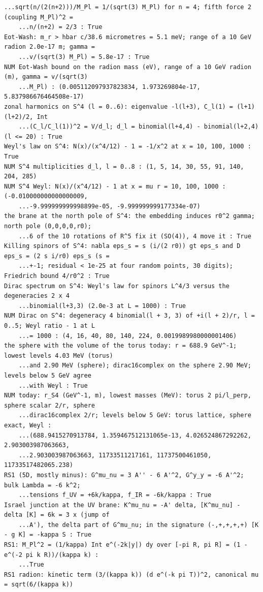 \documentclass[10pt,a4paper]{article}
\begin{document}
\begin{Verbatim}[fontsize=\small,frame=single,framesep=2mm]
    ...sqrt(n/(2(n+2)))/M_Pl = 1/(sqrt(3) M_Pl) for n = 4; fifth force 2 (coupling M_Pl)^2 =
    ...n/(n+2) = 2/3 : True
Eot-Wash: m_r > hbar c/38.6 micrometres = 5.1 meV; range of a 10 GeV radion 2.0e-17 m; gamma =
    ...v/(sqrt(3) M_Pl) = 5.8e-17 : True
NUM Eot-Wash bound on the radion mass (eV), range of a 10 GeV radion (m), gamma = v/(sqrt(3)
    ...M_Pl) : (0.005112097937823834, 1.973269804e-17, 5.837986676464508e-17)
zonal harmonics on S^4 (l = 0..6): eigenvalue -l(l+3), C_l(1) = (l+1)(l+2)/2, Int
    ...(C_l/C_l(1))^2 = V/d_l; d_l = binomial(l+4,4) - binomial(l+2,4) (l <= 20) : True
Weyl's law on S^4: N(x)/(x^4/12) - 1 = -1/x^2 at x = 10, 100, 1000 : True
NUM S^4 multiplicities d_l, l = 0..8 : (1, 5, 14, 30, 55, 91, 140, 204, 285)
NUM S^4 Weyl: N(x)/(x^4/12) - 1 at x = mu r = 10, 100, 1000 : (-0.010000000000000009,
    ...-9.999999999998899e-05, -9.999999999177334e-07)
the brane at the north pole of S^4: the embedding induces r0^2 gamma; north pole (0,0,0,0,r0);
    ...6 of the 10 rotations of R^5 fix it (SO(4)), 4 move it : True
Killing spinors of S^4: nabla eps_s = s (i/(2 r0)) gt eps_s and D eps_s = (2 s i/r0) eps_s (s =
    ...+-1; residual < 1e-25 at four random points, 30 digits); Friedrich bound 4/r0^2 : True
Dirac spectrum on S^4: Weyl's law for spinors L^4/3 versus the degeneracies 2 x 4
    ...binomial(l+3,3) (2.0e-3 at L = 1000) : True
NUM Dirac on S^4: degeneracy 4 binomial(l + 3, 3) of +i(l + 2)/r, l = 0..5; Weyl ratio - 1 at L
    ...= 1000 : (4, 16, 40, 80, 140, 224, 0.0019989980000001406)
the sphere with the volume of the torus today: r = 688.9 GeV^-1; lowest levels 4.03 MeV (torus)
    ...and 2.90 MeV (sphere); dirac16complex on the sphere 2.90 MeV; levels below 5 GeV agree
    ...with Weyl : True
NUM today: r_S4 (GeV^-1, m), lowest masses (MeV): torus 2 pi/l_perp, sphere scalar 2/r, sphere
    ...dirac16complex 2/r; levels below 5 GeV: torus lattice, sphere exact, Weyl :
    ...(688.9415270913784, 1.359467512131065e-13, 4.026524867292262, 2.903003987063663,
    ...2.903003987063663, 11733511217161, 11737500461050, 11733517482065.238)
RS1 (5D, mostly minus): G^mu_nu = 3 A'' - 6 A'^2, G^y_y = -6 A'^2; bulk Lambda = -6 k^2;
    ...tensions f_UV = +6k/kappa, f_IR = -6k/kappa : True
Israel junction at the UV brane: K^mu_nu = -A' delta, [K^mu_nu] - delta [K] = 6k = 3 x (jump of
    ...A'), the delta part of G^mu_nu; in the signature (-,+,+,+,+) [K - g K] = -kappa S : True
RS1: M_Pl^2 = (1/kappa) Int e^(-2k|y|) dy over [-pi R, pi R] = (1 - e^(-2 pi k R))/(kappa k) :
    ...True
RS1 radion: kinetic term (3/(kappa k)) (d e^(-k pi T))^2, canonical mu = sqrt(6/(kappa k))

\end{Verbatim}
\end{document}
